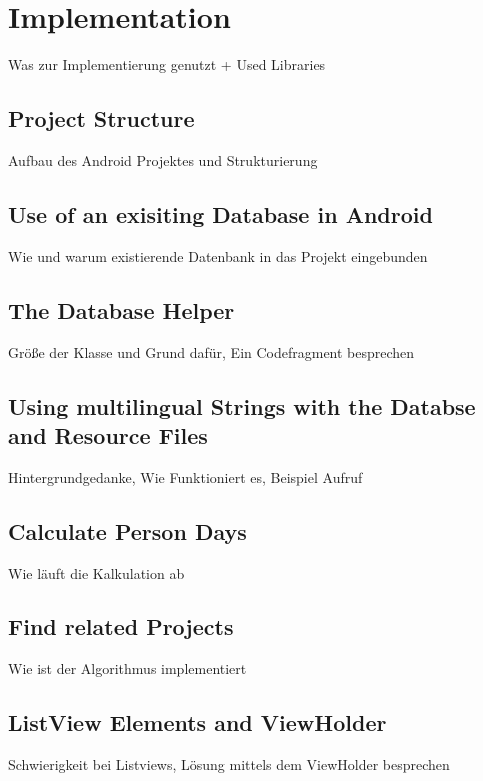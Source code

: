 \chapter{Implementation}

Was zur Implementierung genutzt + Used Libraries


\section{Project Structure}

Aufbau des Android Projektes und Strukturierung

\section{Use of an exisiting Database in Android}

Wie und warum existierende Datenbank in das Projekt eingebunden

\section{The Database Helper}

Größe der Klasse und Grund dafür, Ein Codefragment besprechen

\section{Using multilingual Strings with the Databse and Resource Files}

Hintergrundgedanke, Wie Funktioniert es, Beispiel Aufruf

\section{Calculate Person Days}

Wie läuft die Kalkulation ab

\section{Find related Projects}

Wie ist der Algorithmus implementiert

\section{ListView Elements and ViewHolder}

Schwierigkeit bei Listviews, Lösung mittels dem ViewHolder besprechen

